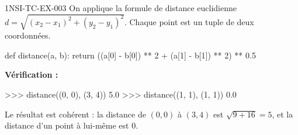\begin{corrige}{1NSI-TC-EX-003}
On applique la formule de distance euclidienne $d = \sqrt{(x_2-x_1)^2 + (y_2-y_1)^2}$.
Chaque point est un tuple de deux coordonnées.

\begin{python}
def distance(a, b):
    return ((a[0] - b[0]) ** 2 + (a[1] - b[1]) ** 2) ** 0.5
\end{python}

\textbf{Vérification :}
\begin{console}
>>> distance((0, 0), (3, 4))
5.0
>>> distance((1, 1), (1, 1))
0.0
\end{console}

Le résultat est cohérent : la distance de $(0,0)$ à $(3,4)$
est $\sqrt{9+16} = 5$, et la distance d'un point à lui-même est 0.
\end{corrige}
